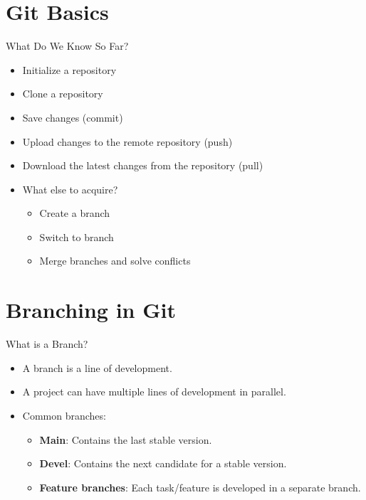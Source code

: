 \section{Git Basics}

\begin{frame}{What Do We Know So Far?}
  \begin{itemize}
    \item Initialize a repository
    \item Clone a repository
    \item Save changes (commit)
    \item Upload changes to the remote repository (push)
    \item Download the latest changes from the repository (pull)
    \item What else to acquire?
    \begin{itemize}
        \item Create a branch
        \item Switch to branch
        \item Merge branches and solve conflicts
    \end{itemize}
  \end{itemize}
\end{frame}

\section{Branching in Git}

\begin{frame}{What is a Branch?}
  \begin{itemize}
    \item A branch is a line of development.
    \item A project can have multiple lines of development in parallel.
    \item Common branches:
      \begin{itemize}
        \item \textbf{Main}: Contains the last stable version.
        \item \textbf{Devel}: Contains the next candidate for a stable version.
        \item \textbf{Feature branches}: Each task/feature is developed in a separate branch.
      \end{itemize}
  \end{itemize}
\end{frame}

